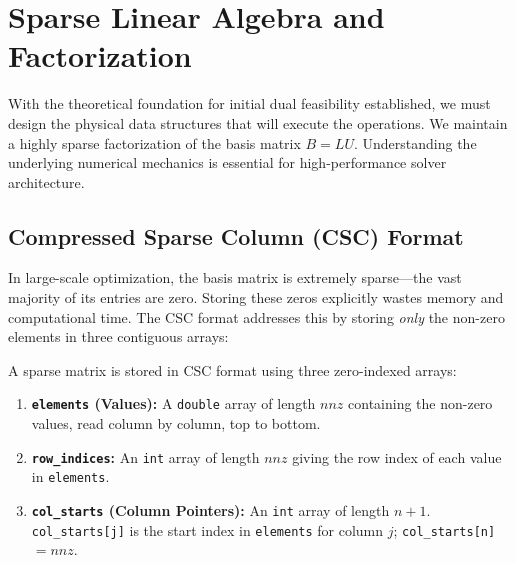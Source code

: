 \documentclass[11pt, a4paper]{article}
\begin{document}
\section{Sparse Linear Algebra and Factorization}

With the theoretical foundation for initial dual feasibility established, we must design the physical data structures that will execute the operations. We maintain a highly sparse factorization of the basis matrix $B = LU$. Understanding the underlying numerical mechanics is essential for high-performance solver architecture.

\subsection{Compressed Sparse Column (CSC) Format}

In large-scale optimization, the basis matrix is extremely sparse---the vast majority of its entries are zero. Storing these zeros explicitly wastes memory and computational time. The CSC format addresses this by storing \emph{only} the non-zero elements in three contiguous arrays:

\begin{definition}
A sparse matrix is stored in CSC format using three zero-indexed arrays:
\begin{enumerate}[label=\textbf{\arabic*.}, leftmargin=*, itemsep=2pt]
    \item \textbf{\texttt{elements} (Values):} A \texttt{double} array of length $nnz$ containing the non-zero values, read column by column, top to bottom.
    \item \textbf{\texttt{row\_indices}:} An \texttt{int} array of length $nnz$ giving the row index of each value in \texttt{elements}.
    \item \textbf{\texttt{col\_starts} (Column Pointers):} An \texttt{int} array of length $n+1$. \texttt{col\_starts[j]} is the start index in \texttt{elements} for column $j$; \texttt{col\_starts[n]} $= nnz$.
\end{enumerate}
\end{definition}
\end{document}
